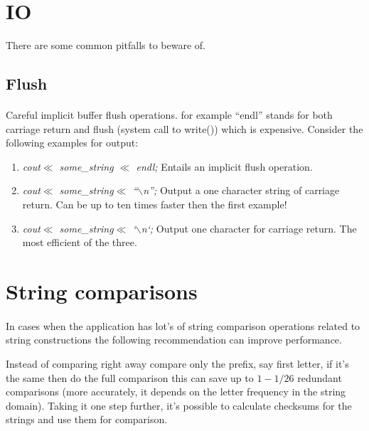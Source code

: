 \documentclass{article}
\begin{document}
\section {IO}

 There are some common pitfalls to beware of.

 \subsection{Flush}
 \paragraph{}
 Careful implicit buffer flush operations.  for example ``endl'' stands for both carriage return and flush (system call to write()) which is expensive.
 Consider the following examples for output:

 \begin{enumerate}
  \item
  \emph{ cout$\ll$ some\_string $\ll$ endl;}
  Entails an implicit flush operation. 
  
  \item 
  \emph{ cout$\ll$ some\_string$\ll$ ``$\backslash$n''; }
  Output a one character string of carriage return. Can be up to ten times faster then the first example!

  \item
  \emph{ cout$\ll$ some\_string$\ll$ `$\backslash$n`; }
  Output  one character for carriage return. The most efficient of the three.

 \end{enumerate}
 

\section{String comparisons}

 \paragraph{}
 In cases when the application has lot's of string comparison operations related to string constructions the following recommendation can improve performance.

 Instead of comparing right away compare only the prefix, say first letter, if it's the same then do the full comparison this can save up to $1 - 1/26$ redundant comparisons (more accurately, it depends on the letter frequency in the string domain).
 Taking it one step further, it's possible to calculate checksums for the strings and use them for comparison.
\end{document}
